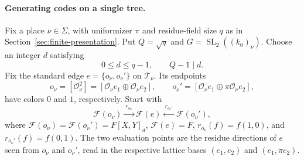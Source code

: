 \documentclass[11pt,letterpaper]{article}
\renewcommand{\le}{\leqslant}
\theoremstyle{definition}
\theoremstyle{remark}
\newcommand{\cF}{\mathcal F}
\newcommand{\SL}{\operatorname{SL}}
\begin{document}
\paragraph{Generating codes on a single tree.}
Fix a place $\nu\in\Sigma$, with uniformizer $\pi$ and residue-field
size $q$ as in Section~\ref{sec:finite-presentation}. Put $Q=\sqrt q$
and $G=\SL_2((k_0)_\nu)$.
Choose an integer $d$ satisfying
\begin{equation}
 0\le d\le q-1,\qquad Q-1\mid d.
 \label{eq:admissible-degrees}
\end{equation}
Fix the standard edge $e=\{o_\nu,o_\nu'\}$ on $\mathcal T_\nu$. Its endpoints
\[
 o_\nu=[\mathcal O_\nu^2] = [\mathcal O_\nu e_1\oplus\mathcal O_\nu e_2],\qquad
 o_\nu'=[\mathcal O_\nu e_1\oplus\pi\mathcal O_\nu e_2],
\]
have colors $0$ and $1$, respectively. Start with
\begin{equation}
 \cF(o_\nu)\xrightarrow{\ r_{o_\nu}\ }\cF(e)
 \xleftarrow{\ r_{o_\nu'}\ }\cF(o_\nu'),
 \label{eq:standard-edge-data}
\end{equation}
where $\cF(o_\nu)=\cF(o_\nu')=F[X,Y]_d$, $\cF(e)=F$,
$r_{o_\nu}(f)=f(1,0)$, and $r_{o_\nu'}(f)=f(0,1)$.
The two evaluation points are the residue directions of $e$ seen from
$o_\nu$ and $o_\nu'$, read in the respective lattice bases
$(e_1,e_2)$ and $(e_1,\pi e_2)$.
\end{document}
